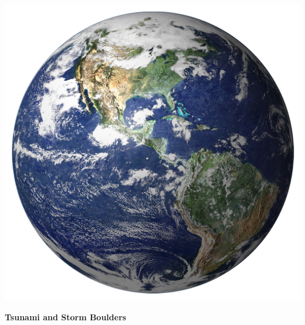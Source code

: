 \documentclass{beamer}
\begin{document}
\begin{frame}[c]
  \begin{center}
    {\includegraphics[scale=0.36]{earthover.png}}
  \end{center}
\end{frame}

\begin{frame}[c]
\begin{center}
\textbf{\huge \color{DarkFern}Tsunami and Storm Boulders}
\end{center}
\end{frame}
\end{document}

